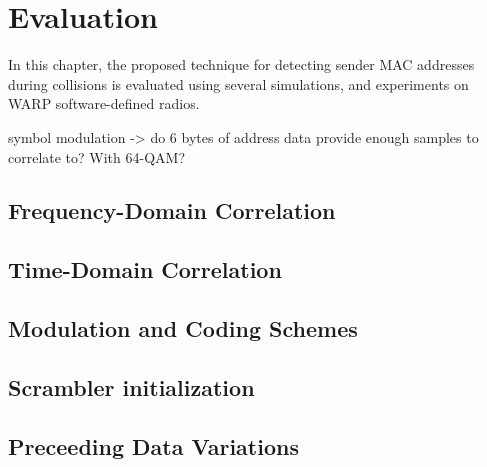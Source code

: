 
\chapter{Evaluation}\label{ch:evaluation}
\glsresetall %

In this chapter, the proposed technique for detecting sender MAC addresses during collisions is evaluated using several simulations, and experiments on WARP software-defined radios.

symbol modulation -> do 6 bytes of address data provide enough samples to correlate to? With 64-QAM?



\section{Frequency-Domain Correlation}



\section{Time-Domain Correlation}\label{sec:freqd-correlation}



\section{Modulation and Coding Schemes}



\section{Scrambler initialization}



\section{Preceeding Data Variations}


